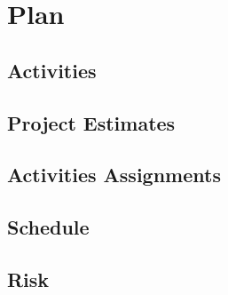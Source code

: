 \documentclass{article}
\begin{document}
\section{Plan}

\subsection{Activities}

\subsection{Project Estimates}

\subsection{Activities Assignments}

\subsection{Schedule}

\subsection{Risk}
\end{document}
